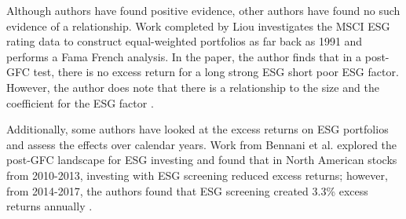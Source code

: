 Although authors have found positive evidence, other authors have found no such evidence of a relationship. Work completed by Liou investigates the MSCI ESG rating data to construct equal-weighted portfolios as far back as 1991  and performs a Fama French analysis. In the paper, the author finds that in a post-GFC test, there is no excess return for a long strong ESG short poor ESG factor. However, the author does note that there is a relationship to the size and the coefficient for the ESG factor \cite{Lioui2018ESGFI}. 

Additionally, some authors have looked at the excess returns on ESG portfolios and assess the effects over calendar years. Work from Bennani et al. explored the post-GFC landscape for ESG investing and found that in North American stocks from 2010-2013, investing with ESG screening reduced excess returns; however, from 2014-2017, the authors found that ESG screening created 3.3\% excess returns annually \cite{Bennani2018HowEI}.


